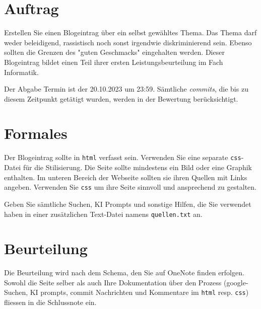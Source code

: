 \documentclass[11pt,a4paper]{report}
\begin{document}
\section*{Auftrag}
Erstellen Sie einen Blogeintrag über ein selbst gewähltes Thema. Das Thema darf weder beleidigend, rassistisch noch sonst irgendwie diskriminierend sein. Ebenso sollten die Grenzen des "guten Geschmacks" eingehalten werden. Dieser Blogeintrag bildet einen Teil ihrer ersten Leistungsbeurteilung im Fach Informatik. 

Der Abgabe Termin ist der 20.10.2023 um 23:59. Sämtliche \emph{commits}, die bis zu diesem Zeitpunkt getätigt wurden, werden in der Bewertung berücksichtigt.

\section*{Formales} 
Der Blogeintrag sollte in \verb|html| verfasst sein. Verwenden Sie eine separate \verb|css|-Datei für die Stilisierung. Die Seite sollte mindestens ein Bild oder eine Graphik enthalten.
Im unteren Bereich der Webseite sollten sie ihren Quellen mit Links angeben. Verwenden Sie \verb|css| um ihre Seite sinnvoll und ansprechend zu gestalten.

Geben Sie sämtliche Suchen, KI Prompts und sonstige Hilfen, die Sie verwendet haben in einer zusätzlichen Text-Datei namens \verb|quellen.txt| an.

\section*{Beurteilung}
Die Beurteilung wird nach dem Schema, den Sie auf OneNote finden erfolgen. Sowohl die Seite selber als auch Ihre Dokumentation über den Prozess (google-Suchen, KI prompts, commit Nachrichten und Kommentare im \verb|html| resp. \verb|css|) fliessen in die Schlussnote ein.
\end{document}
